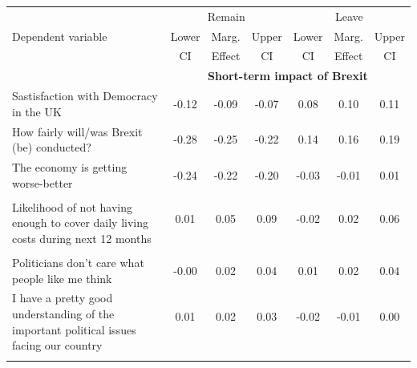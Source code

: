 \documentclass[12pt, letter]{article}
\begin{document}
\footnotesize
\begin{center}
\begin{longtable}{lcccccc}
\toprule[1.5pt]
  & \multicolumn{3}{c}{Remain} & \multicolumn{3}{c}{Leave} \\
  \cmidrule[1pt](lr){2-4} \cmidrule[1pt](lr){5-7}
Dependent variable & Lower  & Marg.  & Upper  & Lower & Marg.  & Upper  \\
 &  CI &  Effect & CI &  CI & Effect & CI \\ 
\toprule[1pt]
& \multicolumn{6}{c}{\textbf{Short-term impact of Brexit}} \\[3pt]
Sastisfaction with Democracy in the UK & -0.12 & -0.09 & -0.07 & 0.08 & 0.10 & 0.11 \\ 
How fairly will/was Brexit (be) conducted? & -0.28 & -0.25 & -0.22 & 0.14 & 0.16 & 0.19 \\ [3pt]
The economy is getting worse-better & -0.24 & -0.22 & -0.20 & -0.03 & -0.01 & 0.01 \\\\[3pt] 
\multirow{2}{200pt}{Likelihood of not having enough to cover daily living costs during next 12 months} & 0.01 & 0.05 & 0.09 & -0.02 & 0.02 & 0.06 \\ \\ 
\\[3pt]
Politicians don't care what people like me think & -0.00 & 0.02 & 0.04 & 0.01 & 0.02 & 0.04 \\[3pt] 
\multirow{2}{200pt}{I have a pretty good understanding of the important political issues facing our country} & 0.01 & 0.02 & 0.03 & -0.02 & -0.01 & 0.00 \\  
\\[3pt]
   \\[-7pt]


\end{longtable}
\end{center}
\end{document}
